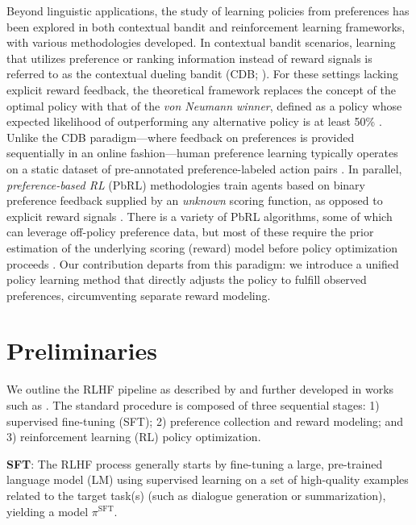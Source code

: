 Beyond linguistic applications, the study of learning policies from preferences has been explored in both contextual bandit and reinforcement learning frameworks, with various methodologies developed. In contextual bandit scenarios, learning that utilizes preference or ranking information instead of reward signals is referred to as the contextual dueling bandit (CDB; \cite{yue2012karmed,dudik2015contextual}). For these settings lacking explicit reward feedback, the theoretical framework replaces the concept of the optimal policy with that of the \textit{von Neumann winner}, defined as a policy whose expected likelihood of outperforming any alternative policy is at least 50\% \citep{dudik2015contextual}. Unlike the CDB paradigm—where feedback on preferences is provided sequentially in an online fashion—human preference learning typically operates on a static dataset of pre-annotated preference-labeled action pairs \citep{yan2022human}. In parallel, \textit{preference-based RL} (PbRL) methodologies train agents based on binary preference feedback supplied by an \textit{unknown} scoring function, as opposed to explicit reward signals \citep{BusaFekete2014,ruiz2023dueling}. There is a variety of PbRL algorithms, some of which can leverage off-policy preference data, but most of these require the prior estimation of the underlying scoring (reward) model before policy optimization proceeds \citep{jain2013learning,BusaFekete2014,christiano2017deep,sadigh2017active,kupcsik2018learning}. Our contribution departs from this paradigm: we introduce a unified policy learning method that directly adjusts the policy to fulfill observed preferences, circumventing separate reward modeling.

\section{Preliminaries}\label{section:prelims}

We outline the RLHF pipeline as described by \citeauthor{ziegler2020finetuning} and further developed in works such as \citep{stiennon2022learning, bai2022training, ouyang2022training}. The standard procedure is composed of three sequential stages: 1) supervised fine-tuning (SFT); 2) preference collection and reward modeling; and 3) reinforcement learning (RL) policy optimization.

\textbf{SFT}: The RLHF process generally starts by fine-tuning a large, pre-trained language model (LM) using supervised learning on a set of high-quality examples related to the target task(s) (such as dialogue generation or summarization), yielding a model $\pi^\text{SFT}$.

